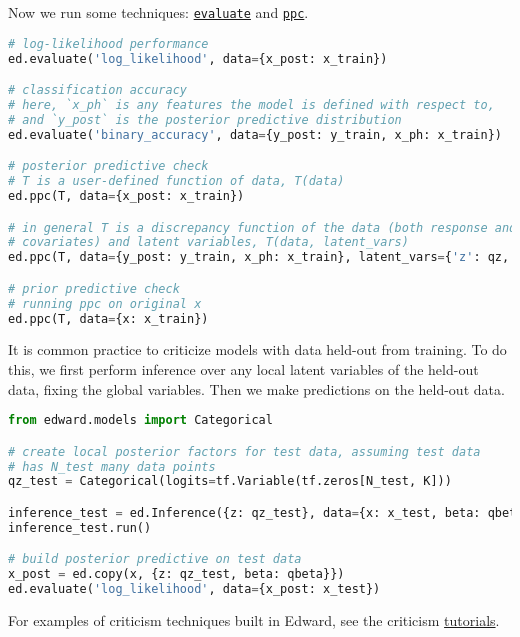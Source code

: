 Now we run some techniques:
\href{/tutorials/point-evaluation}{\texttt{evaluate}}
and
\href{/tutorials/ppc}{\texttt{ppc}}.

\begin{lstlisting}[language=Python]
# log-likelihood performance
ed.evaluate('log_likelihood', data={x_post: x_train})

# classification accuracy
# here, `x_ph` is any features the model is defined with respect to,
# and `y_post` is the posterior predictive distribution
ed.evaluate('binary_accuracy', data={y_post: y_train, x_ph: x_train})

# posterior predictive check
# T is a user-defined function of data, T(data)
ed.ppc(T, data={x_post: x_train})

# in general T is a discrepancy function of the data (both response and
# covariates) and latent variables, T(data, latent_vars)
ed.ppc(T, data={y_post: y_train, x_ph: x_train}, latent_vars={'z': qz, 'beta': qbeta})

# prior predictive check
# running ppc on original x
ed.ppc(T, data={x: x_train})
\end{lstlisting}

It is common practice to criticize models with data held-out from
training. To do this, we first perform inference over any local latent
variables of the held-out data, fixing the global variables.  Then we
make predictions on the held-out data.

\begin{lstlisting}[language=Python]
from edward.models import Categorical

# create local posterior factors for test data, assuming test data
# has N_test many data points
qz_test = Categorical(logits=tf.Variable(tf.zeros[N_test, K]))

inference_test = ed.Inference({z: qz_test}, data={x: x_test, beta: qbeta})
inference_test.run()

# build posterior predictive on test data
x_post = ed.copy(x, {z: qz_test, beta: qbeta}})
ed.evaluate('log_likelihood', data={x_post: x_test})
\end{lstlisting}

For examples of criticism techniques built in Edward, see the
criticism
\href{/tutorials/}{tutorials}.


